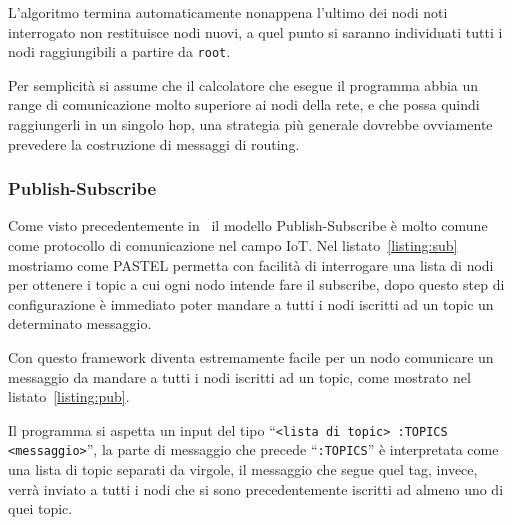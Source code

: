 \documentclass[10pt]{article}
\begin{document}
L'algoritmo termina automaticamente nonappena l'ultimo dei nodi noti interrogato non restituisce nodi nuovi, a quel punto si saranno individuati tutti i nodi raggiungibili a partire da \texttt{root}.

Per semplicità si assume che il calcolatore che esegue il programma abbia un range di comunicazione molto superiore ai nodi della rete, e che possa quindi raggiungerli in un singolo hop, una strategia più generale dovrebbe ovviamente prevedere la costruzione di messaggi di routing.



\subsubsection{Publish-Subscribe}\label{subsubsection:pub-sub}

Come visto precedentemente in~\cite{tandale2017empirical} il modello Publish-Subscribe è molto comune come protocollo di comunicazione nel campo IoT. Nel listato~\ref{listing:sub} mostriamo come PASTEL permetta con facilità di interrogare una lista di nodi per ottenere i topic a cui ogni nodo intende fare il subscribe, dopo questo step di configurazione è immediato poter mandare a tutti i nodi iscritti ad un topic un determinato messaggio.





Con questo framework diventa estremamente facile per un nodo comunicare un messaggio da mandare a tutti i nodi iscritti ad un topic, come mostrato nel listato~\ref{listing:pub}.

Il programma si aspetta un input del tipo ``\texttt{<lista di topic> :TOPICS <messaggio>}'', la parte di messaggio che precede ``\texttt{:TOPICS}'' è interpretata come una lista di topic separati da virgole, il messaggio che segue quel tag, invece, verrà inviato a tutti i nodi che si sono precedentemente iscritti ad almeno uno di quei topic.


\end{document}
